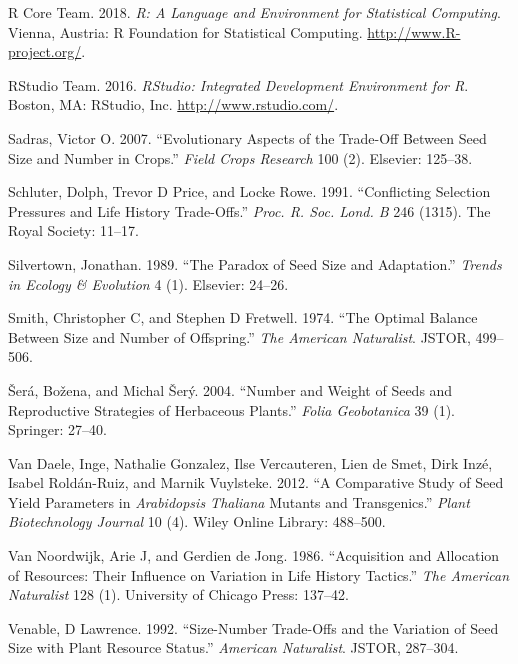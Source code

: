 \documentclass[]{article}
\begin{document}
\leavevmode\hypertarget{ref-RCT2015}{}%
R Core Team. 2018. \emph{R: A Language and Environment for Statistical Computing}. Vienna, Austria: R Foundation for Statistical Computing. \url{http://www.R-project.org/}.

\leavevmode\hypertarget{ref-RStudioTeam2015}{}%
RStudio Team. 2016. \emph{RStudio: Integrated Development Environment for R}. Boston, MA: RStudio, Inc. \url{http://www.rstudio.com/}.

\leavevmode\hypertarget{ref-Sadras2007}{}%
Sadras, Victor O. 2007. ``Evolutionary Aspects of the Trade-Off Between Seed Size and Number in Crops.'' \emph{Field Crops Research} 100 (2). Elsevier: 125--38.

\leavevmode\hypertarget{ref-schluter1991conflicting}{}%
Schluter, Dolph, Trevor D Price, and Locke Rowe. 1991. ``Conflicting Selection Pressures and Life History Trade-Offs.'' \emph{Proc. R. Soc. Lond. B} 246 (1315). The Royal Society: 11--17.

\leavevmode\hypertarget{ref-Silvertown1989}{}%
Silvertown, Jonathan. 1989. ``The Paradox of Seed Size and Adaptation.'' \emph{Trends in Ecology \& Evolution} 4 (1). Elsevier: 24--26.

\leavevmode\hypertarget{ref-Smith1974}{}%
Smith, Christopher C, and Stephen D Fretwell. 1974. ``The Optimal Balance Between Size and Number of Offspring.'' \emph{The American Naturalist}. JSTOR, 499--506.

\leavevmode\hypertarget{ref-Sera2004}{}%
Šerá, Božena, and Michal Šerý. 2004. ``Number and Weight of Seeds and Reproductive Strategies of Herbaceous Plants.'' \emph{Folia Geobotanica} 39 (1). Springer: 27--40.

\leavevmode\hypertarget{ref-van2012comparative}{}%
Van Daele, Inge, Nathalie Gonzalez, Ilse Vercauteren, Lien de Smet, Dirk Inzé, Isabel Roldán-Ruiz, and Marnik Vuylsteke. 2012. ``A Comparative Study of Seed Yield Parameters in \emph{Arabidopsis Thaliana} Mutants and Transgenics.'' \emph{Plant Biotechnology Journal} 10 (4). Wiley Online Library: 488--500.

\leavevmode\hypertarget{ref-VanNoordwijk1986}{}%
Van Noordwijk, Arie J, and Gerdien de Jong. 1986. ``Acquisition and Allocation of Resources: Their Influence on Variation in Life History Tactics.'' \emph{The American Naturalist} 128 (1). University of Chicago Press: 137--42.

\leavevmode\hypertarget{ref-Venable1992}{}%
Venable, D Lawrence. 1992. ``Size-Number Trade-Offs and the Variation of Seed Size with Plant Resource Status.'' \emph{American Naturalist}. JSTOR, 287--304.
\end{document}
